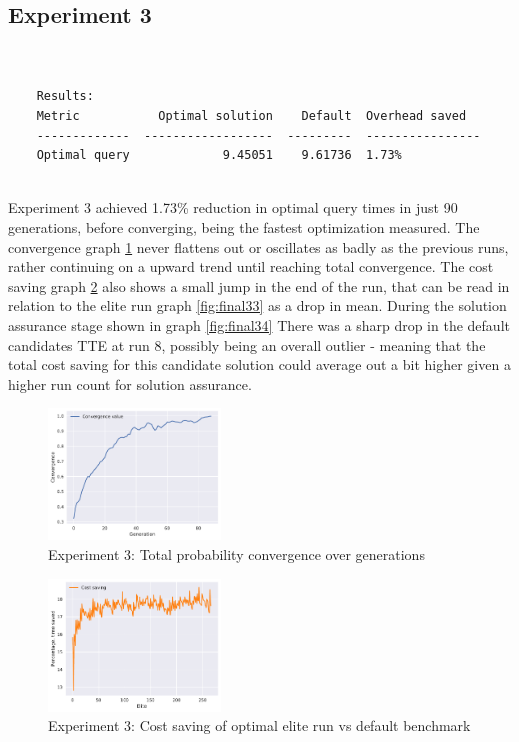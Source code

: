 \documentclass[a4paper,english]{report}
\begin{document}
	\subsection{Experiment 3}
	\begin{verbatim}
	
	
	Results:
	Metric           Optimal solution    Default  Overhead saved
	-------------  ------------------  ---------  ----------------
	Optimal query             9.45051    9.61736  1.73%
	
	\end{verbatim}
	Experiment 3 achieved 1.73\% reduction in optimal query times in just 90 generations, before converging, being the fastest optimization measured. The convergence graph \ref{fig:final31} never flattens out or oscillates as badly as the previous runs, rather continuing on a upward trend until reaching total convergence. The cost saving graph \ref{fig:final32} also shows a small jump in the end of the run, that can be read in relation to the elite run graph \ref{fig:final33} as a drop in mean. During the solution assurance stage shown in graph \ref{fig:final34} There was a sharp drop in the default candidates TTE at run 8, possibly being an overall outlier - meaning that the total cost saving for this candidate solution could average out a bit higher given a higher run count for solution assurance.
	\clearpage 
	\begin{figure}[H]
		\centering
		\includegraphics[width=130pt]{runlogs/final4/1}
		\caption{Experiment 3: Total probability convergence over generations}
		\label{fig:final31}
	\end{figure}
	\begin{figure}[H]
		\centering
		\includegraphics[width=130pt]{runlogs/final4/2}
		\caption{Experiment 3: Cost saving of optimal elite run vs default benchmark}
		\label{fig:final32}
	\end{figure}
\end{document}
